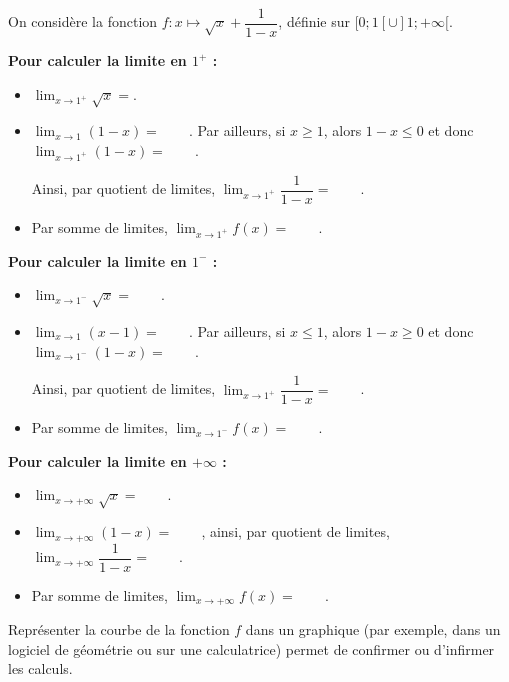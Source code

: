 \documentclass[11pt,fleqn, openany]{book} %
\begin{document}
\begin{example} On considère la fonction $f:x\mapsto \sqrt{x} + \dfrac{1}{1-x}$, définie sur $[0;1[ \cup ]1;+\infty[$.

\textbf{Pour calculer la limite en $1^+$ :}
\begin{itemize}
\item $\displaystyle \lim_{x \to 1^+} \sqrt{x} = $.
\item $\displaystyle \lim_{x \to 1} (1-x)=\qquad$. Par ailleurs, si $x \geqslant 1$, alors $1-x \leqslant 0$ et donc $\displaystyle \lim_{x \to 1^+} (1-x)=\qquad $. 

Ainsi, par quotient de limites, $\displaystyle \lim_{x \to 1^+} \dfrac{1}{1-x}=\qquad$.
\item Par somme de limites, $\displaystyle \lim_{x \to 1^+} f(x)=\qquad$.

\end{itemize}


\textbf{Pour calculer la limite en $1^-$ :}
\begin{itemize}
\item $\displaystyle \lim_{x \to 1^-} \sqrt{x} = \qquad $.
\item $\displaystyle \lim_{x \to 1} (x-1)=\qquad $. Par ailleurs, si $x \leqslant 1$, alors $1-x \geqslant 0$ et donc $\displaystyle \lim_{x \to 1^-} (1-x)=\qquad $. 

Ainsi, par quotient de limites, $\displaystyle \lim_{x \to 1^+} \dfrac{1}{1-x}=\qquad$.
\item Par somme de limites, $\displaystyle \lim_{x \to 1^-} f(x)=\qquad$.
\end{itemize}

\textbf{Pour calculer la limite en $+\infty$ :}
\begin{itemize}
\item $\displaystyle \lim_{x \to +\infty} \sqrt{x} =\qquad$. 
\item $\displaystyle \lim_{x \to +\infty} (1-x)= \qquad$, ainsi, par quotient de limites, $\displaystyle \lim_{x \to +\infty} \dfrac{1}{1-x}=\qquad$.
\item Par somme de limites, $\displaystyle \lim_{x \to +\infty} f(x)=\qquad$.
\end{itemize}

Représenter la courbe de la fonction $f$ dans un graphique (par exemple, dans un logiciel de géométrie ou sur une calculatrice) permet de confirmer ou d'infirmer les calculs.


\begin{center}
\end{center}
\vspace{-1cm}
\end{example}
\newpage 
\end{document}
